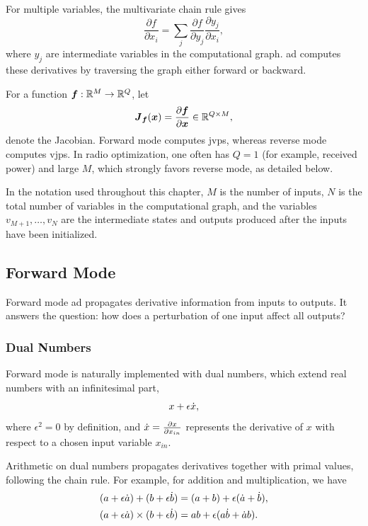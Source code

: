 For multiple variables, the multivariate chain rule gives
\begin{equation}
  \frac{\partial f}{\partial x_i} = \sum_j \frac{\partial f}{\partial y_j} \frac{\partial y_j}{\partial x_i},
\end{equation}
where $y_j$ are intermediate variables in the computational graph. \Gls{ad} computes these derivatives by traversing the graph either forward or backward.

For a function $\boldsymbol{f}:\mathbb{R}^{M}\rightarrow\mathbb{R}^{Q}$, let
\begin{equation}
  \boldsymbol{J}_{\boldsymbol{f}}(\boldsymbol{x}) = \frac{\partial \boldsymbol{f}}{\partial \boldsymbol{x}} \in \mathbb{R}^{Q\times M},
\end{equation}
denote the Jacobian. Forward mode computes \glspl{jvp}, whereas reverse mode computes \glspl{vjp}. In radio optimization, one often has $Q=1$ (for example, received power) and large $M$, which strongly favors reverse mode, as detailed below.

In the notation used throughout this chapter, $M$ is the number of inputs, $N$ is the total number of variables in the computational graph, and the variables $v_{M+1},\ldots,v_N$ are the intermediate states and outputs produced after the inputs have been initialized.

\subsection{Forward Mode}

Forward mode \gls{ad} propagates derivative information from inputs to outputs. It answers the question: how does a perturbation of one input affect all outputs?

\subsubsection{Dual Numbers}

Forward mode is naturally implemented with dual numbers, which extend real numbers with an infinitesimal part,
\begin{equation}
  x + \epsilon \dot{x},
\end{equation}
where $\epsilon^2 = 0$ by definition, and $\dot{x} = \frac{\partial x}{\partial x_{in}}$ represents the derivative of $x$ with respect to a chosen input variable $x_{in}$.

Arithmetic on dual numbers propagates derivatives together with primal values, following the chain rule. For example, for addition and multiplication, we have
\begin{align}
  (a + \epsilon \dot{a}) + (b + \epsilon \dot{b}) &= (a + b) + \epsilon(\dot{a} + \dot{b}), \\
  (a + \epsilon \dot{a}) \times (b + \epsilon \dot{b}) &= ab + \epsilon(a\dot{b} + \dot{a}b).
\end{align}

